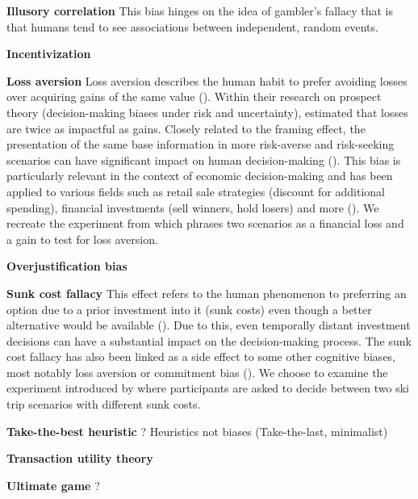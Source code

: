 \par \textbf{Illusory correlation} This bias hinges on the idea of gambler's fallacy that is that humans tend to see associations between independent, random events.

\par \textbf{Incentivization} 

\par \textbf{Loss aversion} Loss aversion describes the human habit to prefer avoiding losses over acquiring gains of the same value  (\cite{liu2023review}). Within their research on prospect theory (decision-making biases under risk and uncertainty), \cite{tversky1992advances} estimated that losses are twice as impactful as gains. Closely related to the framing effect, the presentation of the same base information in more risk-averse and risk-seeking scenarios can have significant impact on human decision-making (\cite{druckman2001evaluating}). This bias is particularly relevant in the context of economic decision-making and has been applied to various fields such as retail sale strategies (discount for additional spending), financial investments (sell winners, hold losers) and more (\cite{liu2023review}). We recreate the experiment from \cite{thaler2015misbehaving} which phrases two scenarios as a financial loss and a gain to test for loss aversion.

\par \textbf{Overjustification bias} 

\par \textbf{Sunk cost fallacy} This effect refers to the human phenomenon to preferring an option due to a prior investment into it (sunk costs) even though a better alternative would be available (\cite{arkes1985psychology}). Due to this, even temporally distant investment decisions can have a substantial impact on the decision-making process. The sunk cost fallacy has also been linked as a side effect to some other cognitive biases, most notably loss aversion or commitment bias (\cite{jarmolowicz2016sunk}). We choose to examine the experiment introduced by \cite{arkes1985psychology} where participants are asked to decide between two ski trip scenarios with different sunk costs.

\par \textbf{Take-the-best heuristic} ? Heuristics not biases (Take-the-last, minimalist)

\par \textbf{Transaction utility theory} 

\par \textbf{Ultimate game} ?


